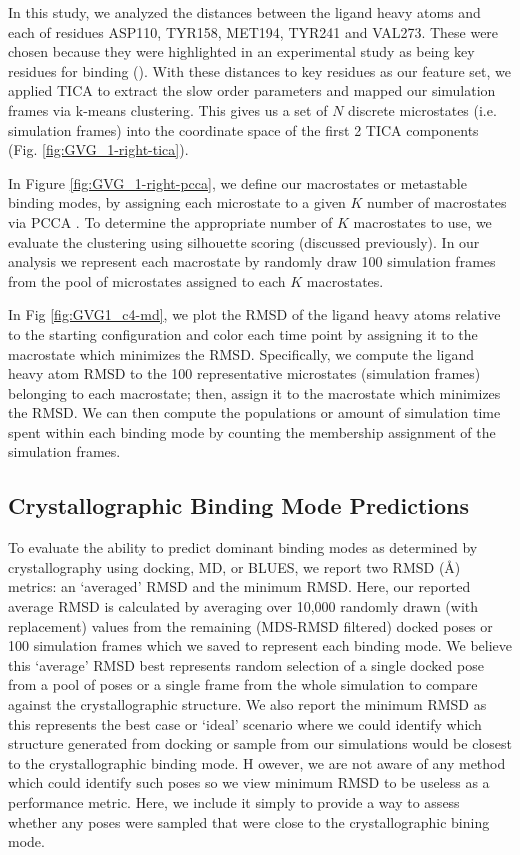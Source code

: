 In this study, we analyzed the distances between the ligand heavy atoms and each of residues ASP110, TYR158, MET194, TYR241 and VAL273.
These were chosen because they were highlighted in an experimental study as being key residues for binding (\cite{lotz_unbiased_2018}).
With these distances to key residues as our feature set, we applied TICA \cite{perez-hernandez_identification_2013} to extract the slow order parameters and mapped our simulation frames via k-means clustering.
This gives us a set of $N$ discrete microstates (i.e. simulation frames) into the coordinate space of the first 2 TICA components (Fig. \ref{fig:GVG_1-right-tica}).

In Figure \ref{fig:GVG_1-right-pcca},  we define our macrostates or metastable binding modes, by assigning each microstate to a given $K$ number of macrostates via PCCA \cite{roblitz_fuzzy_2013,deuflhard_robust_2005}.
To determine the appropriate number of $K$ macrostates to use, we evaluate the clustering using silhouette scoring \cite{scikit_kmeans} (discussed previously).
In our analysis we represent each macrostate by randomly draw 100 simulation frames from the pool of microstates assigned to each $K$ macrostates.

In Fig \ref{fig:GVG1_c4-md}, we plot the RMSD of the ligand heavy atoms relative to the starting configuration and color each time point by assigning it to the macrostate which minimizes the RMSD.
Specifically, we compute the ligand heavy atom RMSD to the 100 representative microstates (simulation frames) belonging to each macrostate; then, assign it to the macrostate which minimizes the RMSD.
We can then compute the populations or amount of simulation time spent within each binding mode by counting the membership assignment of the simulation frames.

\subsection {Crystallographic Binding Mode Predictions}
To evaluate the ability to predict dominant binding modes as determined by crystallography using docking, MD, or BLUES, we report two RMSD ({\AA}) metrics: an `averaged' RMSD and the minimum RMSD.
Here, our reported average RMSD is calculated by averaging over 10,000 randomly drawn (with replacement) values from the remaining (MDS-RMSD filtered) docked poses or 100 simulation frames which we saved to represent each binding mode.
We believe this `average' RMSD best represents random selection of a single docked pose from a pool of poses or a single frame from the whole simulation to compare against the crystallographic structure.
We also report the minimum RMSD as this represents the best case or `ideal' scenario where we could identify which structure generated from docking or sample from our simulations would be closest to the crystallographic binding mode. H
owever, we are not aware of any method which could identify such poses so we view minimum RMSD to be useless as a performance metric.
Here, we include it simply to provide a way to assess whether any poses were sampled that were close to the crystallographic bining mode.

